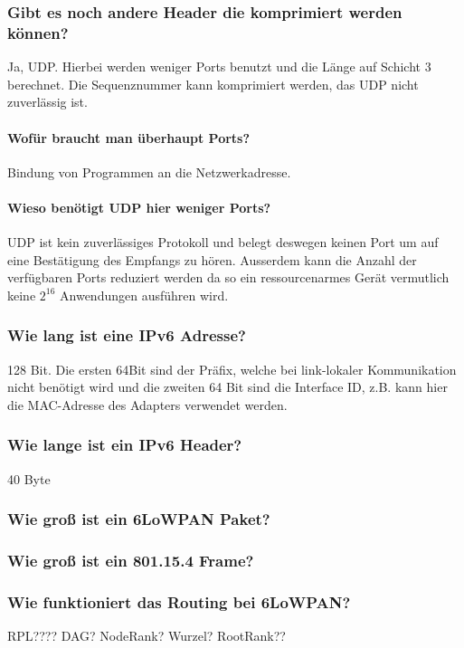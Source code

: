 		\subsubsection{Gibt es noch andere Header die komprimiert werden können?}
		Ja, UDP. Hierbei werden weniger Ports benutzt und die Länge auf Schicht 3 berechnet. Die Sequenznummer kann komprimiert werden, das UDP nicht zuverlässig ist.
		\paragraph{Wofür braucht man überhaupt Ports?} Bindung von Programmen an die Netzwerkadresse.
		\paragraph{Wieso benötigt UDP hier weniger Ports?} UDP ist kein zuverlässiges Protokoll und belegt deswegen keinen Port um auf eine Bestätigung des Empfangs zu hören.	Ausserdem kann die Anzahl der verfügbaren Ports reduziert werden da so ein ressourcenarmes Gerät vermutlich keine $2^{16}$ Anwendungen ausführen wird.	
		
		
		
		
		
		\subsubsection{Wie lang ist eine IPv6\- Adresse?}
		128 Bit. Die ersten 64Bit sind der Präfix, welche bei link-lokaler Kommunikation nicht benötigt wird und die zweiten 64 Bit sind die Interface ID, z.B. kann hier die MAC-Adresse des Adapters verwendet werden.
		\subsubsection{Wie lange ist ein IPv6\- Header?}
		40 Byte
		\subsubsection{Wie groß ist ein 6LoWPAN Paket?}
		\subsubsection{Wie groß ist ein 801.15.4 Frame?}
		
		\subsubsection{Wie funktioniert das Routing bei 6LoWPAN?}
		RPL???? DAG? NodeRank? Wurzel? RootRank??

